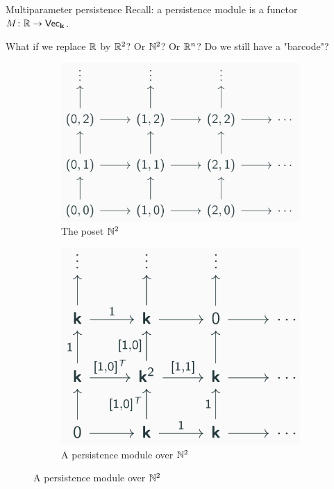 \documentclass{beamer}
\begin{document}
    \begin{frame}{Multiparameter persistence}
        Recall: a persistence module is a functor $M\colon \mathbb{R}\to\normalfont\mathsf{Vec}_{\textbf{k}}$.\pause
        
        What if we replace $\mathbb{R}$ by $\mathbb{R}^2$? Or $\mathbb{N}^2$? Or $\mathbb{R}^n$? Do we still have a "barcode"?\pause
        
        \begin{figure}
            \centering
            \begin{subfigure}{.45\textwidth}
                \centering
                \includegraphics[width=.9\linewidth]{./figures/N2}
                \caption{The poset $\mathbb{N}^2$}
            \end{subfigure}
            \begin{subfigure}{.45\textwidth}
                \centering
                \includegraphics[width=.9\linewidth]{./figures/repN2}
                \caption{A persistence module over $\mathbb{N}^2$}
            \end{subfigure}
        \end{figure}
    \end{frame}
    
\end{document}
